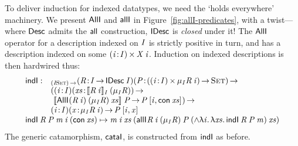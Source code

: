 To deliver induction for indexed datatypes, we need the `holds everywhere'
machinery. We present $\SYMBAllI$ and $\SYMBallI$ in
Figure~\ref{fig:allI-predicates}, with a twist---where
$\Desc$ admits the $\SYMBall$ construction, $\SYMBIDesc$ is \emph{closed}
under it! The $\SYMBAllI$
operator for a description indexed on \(\V{I}\) is strictly positive in
turn, and has a description indexed on
 some \(\SIGMA{\V{i}}{\V{I}}{\V{X}\: \V{i}}\).
Induction on indexed descriptions is then hardwired thus:
%
\[\stk{
\begin{array}{@{}ll}
\inductionI : & _{\PI{\V{I}}{\Set}}
                   \PITEL{\V{R}}{\V{I} \To \IDesc{\V{I}}}
                   \PI{\V{P}}{(\SIGMA{\V{i}}{\V{I}}{\IMu{\V{I}}{\V{R}}{\V{i}}}) \To \Set} \\
                 & (      \PITEL{\V{i}}{\V{I}} 
                          \PI{\V{xs}}{\idescop{\V{R}\: \V{i}}{\V{I}}{(\SYMBIMu_{\V{I}}{\V{R}})}} \\
                 & \   \idescop{\AllI{}
                                     {(\V{R}\: \V{i})}
                                     {(\SYMBIMu_{\V{I}}{\V{R}})}
                                     {\V{xs}}}
                               {}
                               {\V{P}} \To
                       \V{P}\: \pair{\V{i}}{\Con{\V{xs}}}{}) \To \\
                 & \PITEL{\V{i}}{\V{I}}
                   \PI{\V{x}}{\IMu{\V{I}}{\V{R}}{\V{i}}}
                   \V{P}\: \pair{\V{i}}{\V{x}}{}
\end{array} \\
\inductionI\: \V{R}\: \V{P}\: \V{m}\: \V{i}\: (\Con{\V{xs}}) \mapsto 
    \V{m}\: \V{i}\: \V{xs}\: (\allI{}
                                    {\V{R}\: \V{i}}
                                    {(\SYMBIMu_{\V{I}}{\V{R}})}
                                    {\V{P}}
                                    {(\spl{\LAM{\V{i}}\LAM{\V{xs}} \inductionI\: \V{R}\: \V{P}\: \V{m}})}
                                    {\V{xs}})
}\]
%
The generic catamorphism, $\cataI$, is constructed from $\inductionI$
as before.


